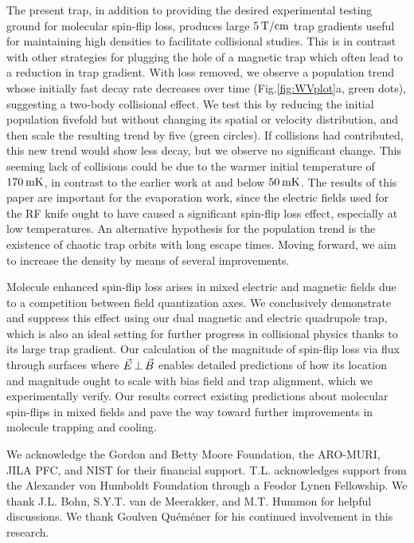\documentclass[%
 reprint,
 amsmath,amssymb,
 aps,
prl,
]{revtex4-1}
\newcommand{\epb}{{$\vec{E}\s {\perp}\s\vec{B}$}}
\newcommand{\s}{{\nobreak\hspace{.2em}}}
\begin{document}
The present trap, in addition to providing the desired experimental testing ground for molecular spin-flip loss, produces large $5\s\text{T/cm}$ trap gradients useful for maintaining high densities to facilitate collisional studies.
This is in contrast with other strategies for plugging the hole of a magnetic trap which often lead to a reduction in trap gradient.
With loss removed, we observe a population trend whose initially fast decay rate decreases over time (Fig.\s\ref{fig:WVplot}a, green dots), suggesting a two-body collisional effect.
We test this by reducing the initial population fivefold but without changing its spatial or velocity distribution\s\cite{ssm}, and then scale the resulting trend by five (green circles). 
If collisions had contributed, this new trend would show less decay, but we observe no significant change.
This seeming lack of collisions could be due to the warmer initial temperature of $170\s\text{mK}$, in contrast to the earlier work at and below $50\s\text{mK}$\s\cite{Stuhl2012evap}.
The results of this paper are important for the evaporation work, since the electric fields used for the RF knife ought to have caused a significant spin-flip loss effect, especially at low temperatures\s\cite{ssm}.
An alternative hypothesis for the population trend is the existence of chaotic trap orbits with long escape times\s\cite{Gonzalez-Ferez2014}.
Moving forward, we aim to increase the density by means of several improvements\s\cite{Even2015,Segev2017}.

Molecule enhanced spin-flip loss arises in mixed electric and magnetic fields due to a competition between field quantization axes.
We conclusively demonstrate and suppress this effect using our dual magnetic and electric quadrupole trap, which is also an ideal setting for further progress in collisional physics thanks to its large trap gradient.
Our calculation of the magnitude of spin-flip loss via flux through surfaces where \epb{} enables detailed predictions of how its location and magnitude ought to scale with bias field and trap alignment, which we experimentally verify.
Our results correct existing predictions about molecular spin-flips in mixed fields and pave the way toward further improvements in molecule trapping and cooling.

\begin{acknowledgments}
We acknowledge the Gordon and Betty Moore Foundation, the ARO-MURI, JILA PFC, and NIST for their financial support. 
T.L. acknowledges support from the Alexander von Humboldt Foundation through a Feodor Lynen Fellowship. 
We thank J.L. Bohn, S.Y.T. van de Meerakker, and M.T. Hummon for helpful discussions. 
We thank Goulven Qu\'em\'ener for his continued involvement in this research.
\end{acknowledgments}



\end{document}
